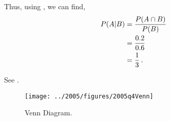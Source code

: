 \begin{subquestions}
\begin{subsubquestions}
Thus, using , we can find,
\begin{align}
	P(A|B) & = \frac{P(A\cap B)}{P(B)} \nonumber \\
	       & = \frac{0.2}{0.6} \nonumber \\
	       & = \frac{1}{3} \,.
\end{align}


\subsubquestion

See .

\begin{figure} [H]
	\begin{center}
		\texttt{[image: ../2005/figures/2005q4Venn]}
		\caption{\label{2005:q4:fig:Venn} Venn Diagram.}
	\end{center}
\end{figure}

\end{subsubquestions}

\end{subquestions}
